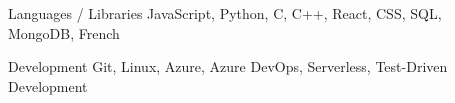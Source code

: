 
\begin{cvskills}
	\cvskill
		{Languages / Libraries}
		{JavaScript, Python, C, C++, React, CSS, SQL, MongoDB, French}

	\cvskill
		{Development}
		{Git, Linux, Azure, Azure DevOps, Serverless, Test-Driven Development}
\end{cvskills}